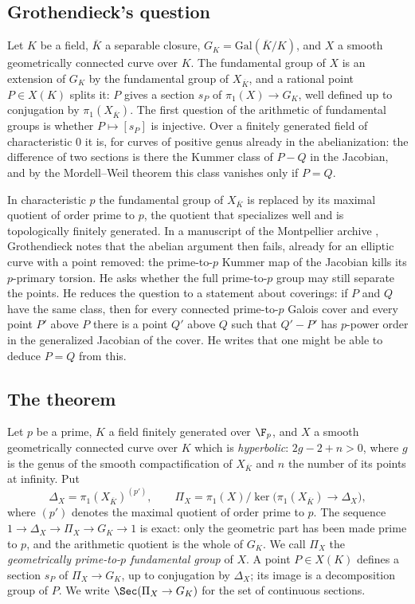 \subsection{Grothendieck's question}
Let $K$ be a field, $\overline K$ a separable closure, $G_K=\mathrm{Gal}(\overline K/K)$, and $X$ a smooth geometrically connected curve over $K$. The fundamental group of $X$ is an extension of $G_K$ by the fundamental group of $X_{\overline K}$, and a rational point $P\in X(K)$ splits it: $P$ gives a section $s_P$ of $\pi_1(X)\to G_K$, well defined up to conjugation by $\pi_1(X_{\overline K})$. The first question of the arithmetic of fundamental groups is whether $P\mapsto[s_P]$ is injective. Over a finitely generated field of characteristic $0$ it is, for curves of positive genus already in the abelianization: the difference of two sections is there the Kummer class of $P-Q$ in the Jacobian, and by the Mordell--Weil theorem this class vanishes only if $P=Q$.

In characteristic $p$ the fundamental group of $X_{\overline K}$ is replaced by its maximal quotient of order prime to $p$, the quotient that specializes well and is topologically finitely generated. In a manuscript of the Montpellier archive \cite[cote 149, ms.~pp.~17--18]{Archive}, Grothendieck notes that the abelian argument then fails, already for an elliptic curve with a point removed: the prime-to-$p$ Kummer map of the Jacobian kills its $p$-primary torsion. He asks whether the full prime-to-$p$ group may still separate the points. He reduces the question to a statement about coverings: if $P$ and $Q$ have the same class, then for every connected prime-to-$p$ Galois cover and every point $P'$ above $P$ there is a point $Q'$ above $Q$ such that $Q'-P'$ has $p$-power order in the generalized Jacobian of the cover. He writes that one might be able to deduce $P=Q$ from this.

\subsection{The theorem}
Let $p$ be a prime, $K$ a field finitely generated over $\F_p$, and $X$ a smooth geometrically connected curve over $K$ which is \emph{hyperbolic}: $2g-2+n>0$, where $g$ is the genus of the smooth compactification of $X_{\overline K}$ and $n$ the number of its points at infinity. Put
\[
 \Delta_X=\pi_1(X_{\overline K})^{(p')},\qquad
 \Pi_X=\pi_1(X)\big/\ker\bigl(\pi_1(X_{\overline K})\to\Delta_X\bigr),
\]
where $(p')$ denotes the maximal quotient of order prime to $p$. The sequence $1\to\Delta_X\to\Pi_X\to G_K\to1$ is exact: only the geometric part has been made prime to $p$, and the arithmetic quotient is the whole of $G_K$. We call $\Pi_X$ the \emph{geometrically prime-to-$p$ fundamental group} of $X$. A point $P\in X(K)$ defines a section $s_P$ of $\Pi_X\to G_K$, up to conjugation by $\Delta_X$; its image is a decomposition group of $P$. We write $\Sec(\Pi_X\to G_K)$ for the set of continuous sections.

